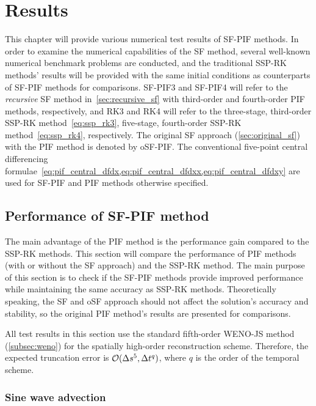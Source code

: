 \chapter{Results}\label{ch:results}

This chapter will provide various numerical test results of SF-PIF methods.
In order to examine the numerical capabilities of the SF method,
several well-known numerical benchmark problems are conducted,
and the traditional SSP-RK methods' results will be provided with the same initial conditions
as counterparts of SF-PIF methods for comparisons.
SF-PIF3 and SF-PIF4 will refer to the \textit{recursive} SF method in~\cref{sec:recursive_sf}
with third-order and fourth-order PIF methods, respectively,
and RK3 and RK4 will refer to the three-stage, third-order SSP-RK method~\cref{eq:ssp_rk3},
five-stage, fourth-order SSP-RK method~\cref{eq:ssp_rk4}, respectively.
The original SF approach (\cref{sec:original_sf}) with the PIF method is denoted by oSF-PIF\@.
The conventional five-point central differencing formulae~\cref{eq:pif_central_dfdx,eq:pif_central_dfdxx,eq:pif_central_dfdxy}
are used for SF-PIF and PIF methods otherwise specified.

\section{Performance of SF-PIF method}\label{sec:result_performance}
The main advantage of the PIF method is the performance gain compared to the SSP-RK methods.
This section will compare the performance of PIF methods (with or without the SF approach)
and the SSP-RK method. The main purpose of this section is to check if the SF-PIF methods provide
improved performance while maintaining the same accuracy as SSP-RK methods.
Theoretically speaking, the SF and oSF approach should not affect the solution's accuracy and stability,
so the original PIF method's results are presented for comparisons.

All test results in this section use the standard fifth-order WENO-JS method (\cref{subsec:weno})
for the spatially high-order reconstruction scheme.
Therefore, the expected truncation error is \( \mathcal{O}(\Delta s^{5}, \Delta t^{q}) \),
where \( q \) is the order of the temporal scheme.

\subsection{Sine wave advection}\label{subsec:sine_wave}

